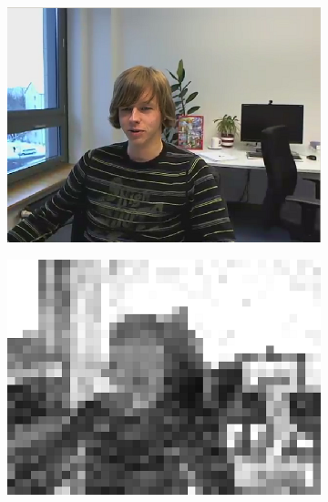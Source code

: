\documentclass[11pt]{article} %
\begin{document}
\begin{figure}
	\centering
	\begin{subfigure}[t]{0.49\textwidth}
		\centering
		\includegraphics[width=\textwidth]{QPOffset/Bi_direction/Paul250kbps_uni_QP_offset_Bi_4.png}
		\caption{}
		\label{fig:Bi-direction QP offset result image}
	\end{subfigure}
	\begin{subfigure}[t]{0.49\textwidth}
		\centering
		\includegraphics[width=\textwidth]{QPOffset/Bi_direction/Paul250kbps_uni_QP_offset_Bi_4_psnr_abs.png}
		\caption{}
		\label{fig:Bi-direction QP offset result psnr}
	\end{subfigure}
	\begin{subfigure}[t]{\textwidth}

\end{subfigure}
\end{figure}
\end{document}
